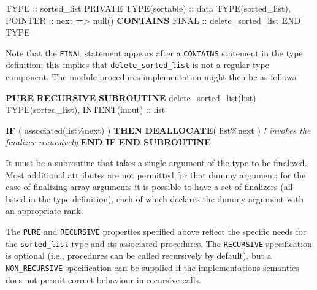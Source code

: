 \documentclass[
]{scrartcl}
\newenvironment{Shaded}{}{}
\newcommand{\CommentTok}[1]{\textcolor[rgb]{0.38,0.63,0.69}{\textit{#1}}}
\newcommand{\DataTypeTok}[1]{\textcolor[rgb]{0.56,0.13,0.00}{#1}}
\newcommand{\FunctionTok}[1]{\textcolor[rgb]{0.02,0.16,0.49}{#1}}
\newcommand{\KeywordTok}[1]{\textcolor[rgb]{0.00,0.44,0.13}{\textbf{#1}}}
\newcommand{\NormalTok}[1]{#1}
\newcommand{\OperatorTok}[1]{\textcolor[rgb]{0.40,0.40,0.40}{#1}}
\begin{document}
\begin{Shaded}
\begin{Highlighting}[]
\DataTypeTok{TYPE} \DataTypeTok{::}\NormalTok{ sorted\_list}
   \DataTypeTok{PRIVATE}
   \DataTypeTok{TYPE(sortable)} \DataTypeTok{::}\NormalTok{ data}
   \DataTypeTok{TYPE(sorted\_list)}\NormalTok{, }\DataTypeTok{POINTER} \DataTypeTok{::}\NormalTok{ next }\KeywordTok{=}\OperatorTok{\textgreater{}}\NormalTok{ null()}
\KeywordTok{CONTAINS}
   \DataTypeTok{FINAL} \DataTypeTok{::}\NormalTok{ delete\_sorted\_list}
\DataTypeTok{END TYPE}
\end{Highlighting}
\end{Shaded}

Note that the \texttt{FINAL} statement appears after a \texttt{CONTAINS}
statement in the type definition; this implies that
\texttt{delete\_sorted\_list} is not a regular type component. The
module procedure\textquotesingle s implementation might then be as
follows:

\begin{Shaded}
\begin{Highlighting}[]
\KeywordTok{PURE} \KeywordTok{RECURSIVE} \KeywordTok{SUBROUTINE}\NormalTok{ delete\_sorted\_list(list)}
   \DataTypeTok{TYPE(sorted\_list)}\NormalTok{, }\DataTypeTok{INTENT(inout)} \DataTypeTok{::}\NormalTok{ list}

   \KeywordTok{IF}\NormalTok{ ( }\FunctionTok{associated}\NormalTok{(list}\OperatorTok{\%}\NormalTok{next) ) }\KeywordTok{THEN}
      \KeywordTok{DEALLOCATE}\NormalTok{( list}\OperatorTok{\%}\NormalTok{next )    }\CommentTok{! invokes the finalizer recursively}
   \KeywordTok{END IF}
\KeywordTok{END SUBROUTINE}
\end{Highlighting}
\end{Shaded}

It must be a subroutine that takes a single argument of the type to be
finalized. Most additional attributes are not permitted for that dummy
argument; for the case of finalizing array arguments it is possible to
have a set of finalizers (all listed in the type definition), each of
which declares the dummy argument with an appropriate rank.

The \texttt{PURE} and \texttt{RECURSIVE} properties specified above
reflect the specific needs for the \texttt{sorted\_list} type and its
associated procedures. The \texttt{RECURSIVE} specification is optional
(i.e., procedures can be called recursively by default), but a
\texttt{NON\_RECURSIVE} specification can be supplied if the
implementation\textquotesingle s semantics does not permit correct
behaviour in recursive calls.
\end{document}
